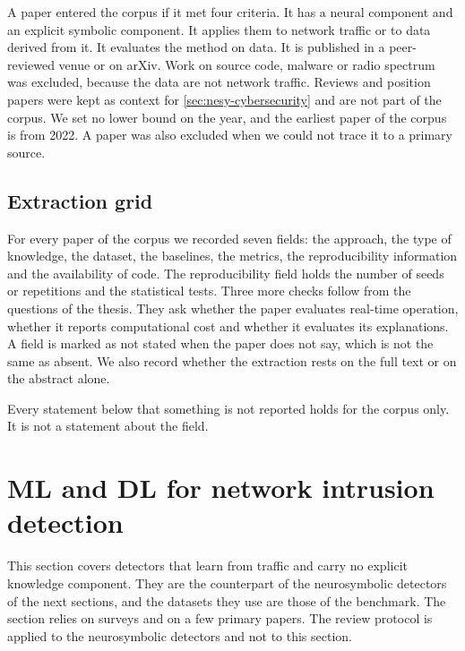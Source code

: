 A paper entered the corpus if it met four criteria. It has a neural component
and an explicit symbolic component. It applies them to network traffic or to
data derived from it. It evaluates the method on data. It is published in a
peer-reviewed venue or on arXiv. Work on source code, malware or radio
spectrum was excluded, because the data are not network traffic. Reviews and
position papers were kept as context for \cref{sec:nesy-cybersecurity} and are
not part of the corpus. We set no lower bound on the year, and the earliest paper
of the corpus is from 2022. A paper was also excluded when we could not trace it
to a primary source.

\subsection{Extraction grid}
\label{sec:review-grid}

For every paper of the corpus we recorded seven fields: the approach, the type
of knowledge, the dataset, the baselines, the metrics, the reproducibility
information and the availability of code. The reproducibility field holds the
number of seeds or repetitions and the statistical tests. Three more checks
follow from the questions of the thesis. They ask whether the paper evaluates
real-time operation, whether it reports computational cost and whether it
evaluates its explanations. A field is marked as not stated when the paper does
not say, which is not the same as absent. We also record whether the extraction
rests on the full text or on the abstract alone.

Every statement below that something is not reported holds for the corpus only.
It is not a statement about the field.

\section{ML and DL for network intrusion detection}
\label{sec:ml-dl-nids}

This section covers detectors that learn from traffic and carry no explicit
knowledge component. They are the counterpart of the neurosymbolic detectors
of the next sections, and the datasets they use are those of the benchmark.
The section relies on surveys and on a few primary papers. The review
protocol is applied to the neurosymbolic detectors and not to this section.

